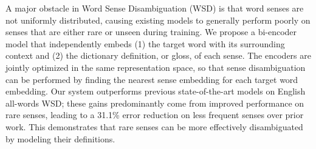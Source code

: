 A major obstacle in Word Sense Disambiguation (WSD) is that word senses are not uniformly distributed, causing existing models to generally perform poorly on senses that are either rare or unseen during training. We propose a bi-encoder model that independently embeds (1) the target word with its surrounding context and (2) the dictionary definition, or gloss, of each sense. The encoders are jointly optimized in the same representation space, so that sense disambiguation can be performed by finding the nearest sense embedding for each target word embedding. Our system outperforms previous state-of-the-art models on English all-words WSD; these gains predominantly come from improved performance on rare senses, leading to a 31.1\% error reduction on less frequent senses over prior work. This demonstrates that rare senses can be more effectively disambiguated by modeling their definitions.

